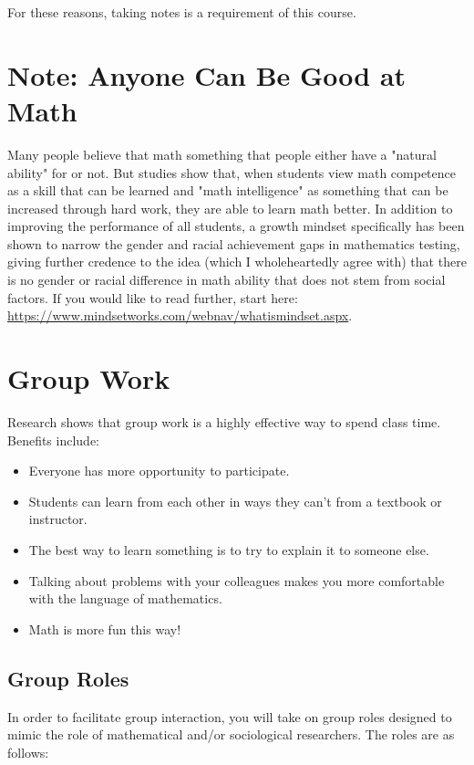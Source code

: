 \documentclass[11pt, a4paper]{article}
\begin{document}
For these reasons, taking notes is a requirement of this course.  

\medskip

\section*{Note: Anyone Can Be Good at Math} Many people believe that math something that people either have a "natural ability" for or not. But studies show that, when students view math competence as a skill that can be learned and "math intelligence" as something that can be increased through hard work, they are able to learn math better. In addition to improving the performance of all students, a growth mindset specifically has been shown to narrow the gender and racial achievement gaps in mathematics testing, giving further credence to the idea (which I wholeheartedly agree with) that there is no gender or racial difference in math ability that does not stem from social factors. If you would like to read further, start here: \url{https://www.mindsetworks.com/webnav/whatismindset.aspx}.
\medskip

\section*{Group Work} Research shows that group work is a highly effective way to spend class time. Benefits include:   
\begin{itemize}
\item Everyone has more opportunity to participate.   
\item Students can learn from each other in ways they can't from a textbook or instructor. 
\item The best way to learn something is to try to explain it to someone else.  
\item Talking about problems with your colleagues makes you more comfortable with the language of mathematics.  
\item Math is more fun this way!     
\end{itemize}

\subsection*{Group Roles}
In order to facilitate group interaction, you will take on group roles designed to mimic the role of mathematical and/or sociological researchers. The roles are as follows:
\end{document}
